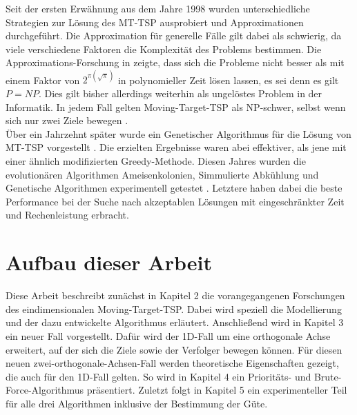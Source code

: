 \documentclass[german,version-2019-11]{uzl-thesis}
\begin{document}
Seit der ersten Erwähnung aus dem Jahre 1998 wurden unterschiedliche Strategien zur Lösung des MT-TSP ausprobiert und Approximationen durchgeführt. Die Approximation für generelle Fälle gilt dabei als schwierig, da viele verschiedene Faktoren die Komplexität des Problems bestimmen. Die Approximations-Forschung in \cite{hammar} zeigte, dass sich die Probleme nicht besser als mit einem Faktor von $2^{\pi(\sqrt{\pi})}$ in polynomieller Zeit lösen lassen, es sei denn es gilt $P=NP$. Dies gilt bisher allerdings weiterhin als ungelöstes Problem in der Informatik. In jedem Fall gelten Moving-Target-TSP als NP-schwer, selbst wenn sich nur zwei Ziele bewegen \cite{hammar}.\\
Über ein Jahrzehnt später wurde ein Genetischer Algorithmus für die Lösung von MT-TSP vorgestellt \cite{choubey2013moving}. Die erzielten Ergebnisse waren abei effektiver, als jene mit einer ähnlich modifizierten Greedy-Methode. Diesen Jahres wurden die evolutionären Algorithmen  \cite{weicker2015evolutionare} Ameisenkolonien, Simmulierte Abkühlung und Genetische Algorithmen experimentell getestet \cite{moraes}. Letztere haben dabei die beste Performance bei der Suche nach akzeptablen Lösungen mit eingeschränkter Zeit und Rechenleistung erbracht.

\section{Aufbau dieser Arbeit}
Diese Arbeit beschreibt zunächst in Kapitel 2 die vorangegangenen Forschungen des eindimensionalen Moving-Target-TSP. Dabei wird speziell die Modellierung und der dazu entwickelte Algorithmus erläutert. Anschließend wird in Kapitel 3 ein neuer Fall vorgestellt. Dafür wird der 1D-Fall um eine orthogonale Achse erweitert, auf der sich die Ziele sowie der Verfolger bewegen können. Für diesen neuen zwei-orthogonale-Achsen-Fall werden theoretische Eigenschaften gezeigt, die auch für den 1D-Fall gelten. So wird in Kapitel 4 ein Prioritäts- und Brute-Force-Algorithmus präsentiert. Zuletzt folgt in Kapitel 5 ein experimenteller Teil für alle drei Algorithmen inklusive der Bestimmung der Güte.

\end{document}
